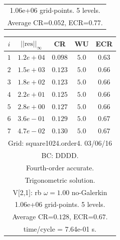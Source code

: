 \begin{table}[hbt]
\begin{center}
{\begin{tabular}{|c|c|c|c|c|}
\multicolumn{5}{|c|}{1.06e+06 grid-points. 5 levels.}  \\
\multicolumn{5}{|c|}{Average CR=$0.052$, ECR=$0.77$.}  \\
\hline 
\end{tabular}
\begin{tabular}{|c|c|c|c|c|} \hline 
 $i$   & $\vert\vert\mbox{res}\vert\vert_\infty$  &  CR     &  WU    & ECR  \\   \hline 
 $ 1$  & $ 1.2e+04$ & $0.098$ & $ 5.0$ & $0.63$ \\ 
 $ 2$  & $ 1.5e+03$ & $0.123$ & $ 5.0$ & $0.66$ \\ 
 $ 3$  & $ 1.8e+02$ & $0.123$ & $ 5.0$ & $0.66$ \\ 
 $ 4$  & $ 2.2e+01$ & $0.125$ & $ 5.0$ & $0.66$ \\ 
 $ 5$  & $ 2.8e+00$ & $0.127$ & $ 5.0$ & $0.66$ \\ 
 $ 6$  & $ 3.6e-01$ & $0.129$ & $ 5.0$ & $0.67$ \\ 
 $ 7$  & $ 4.7e-02$ & $0.130$ & $ 5.0$ & $0.67$ \\ 
\hline 
\multicolumn{5}{|c|}{Grid: square1024.order4. 03/06/16}  \\
\multicolumn{5}{|c|}{BC: DDDD.}  \\
\multicolumn{5}{|c|}{Fourth-order accurate.}  \\
\multicolumn{5}{|c|}{Trigonometric solution.}  \\
\multicolumn{5}{|c|}{V[2,1]: rb $\omega=1.00$ no-Galerkin}  \\
\multicolumn{5}{|c|}{1.06e+06 grid-points. 5 levels.}  \\
\multicolumn{5}{|c|}{Average CR=$0.128$, ECR=$0.67$.}  \\
\multicolumn{5}{|c|}{time/cycle = 7.64e-01 s.}  \\
\hline 
\end{tabular}
\begin{tabular}{|c|c|c|c|c|} \hline 

\end{tabular}}
\end{center}
\end{table}
